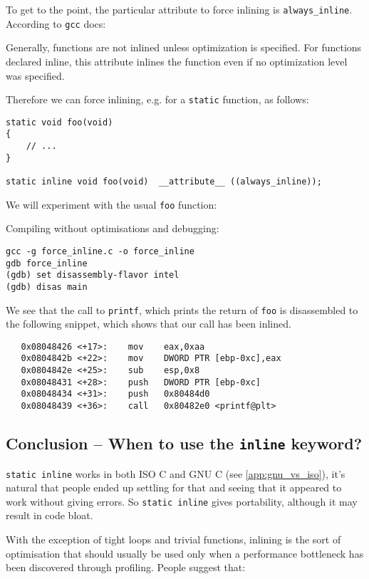 \documentclass[a4paper]{article}
\begin{document}
To get to the point, the particular attribute to force inlining is \texttt{always\_inline}. According to \texttt{gcc} docs:
\begin{myquote}
Generally, functions are not inlined unless optimization is specified. For functions declared inline, this attribute inlines the function even if no optimization level was specified.
\end{myquote}
Therefore we can force inlining, e.g. for a \texttt{static} function, as follows:
\begin{verbatim}
static void foo(void)
{
    // ...
}

static inline void foo(void)  __attribute__ ((always_inline));
\end{verbatim}
We will experiment with the usual \texttt{foo} function:

Compiling without optimisations and debugging:
\begin{lstlisting}[style=terminal]
gcc -g force_inline.c -o force_inline
gdb force_inline
(gdb) set disassembly-flavor intel
(gdb) disas main
\end{lstlisting}
We see that the call to \texttt{printf}, which prints the return of \texttt{foo} is disassembled to the following snippet, which shows that our call has been inlined.
\begin{verbatim}
   0x08048426 <+17>:	mov    eax,0xaa
   0x0804842b <+22>:	mov    DWORD PTR [ebp-0xc],eax
   0x0804842e <+25>:	sub    esp,0x8
   0x08048431 <+28>:	push   DWORD PTR [ebp-0xc]
   0x08048434 <+31>:	push   0x80484d0
   0x08048439 <+36>:	call   0x80482e0 <printf@plt>
\end{verbatim}


\subsection{Conclusion -- When to use the \texttt{inline} keyword?}

\texttt{static inline} works in both ISO C and GNU C (see \ref{app:gnu_vs_iso}), it's natural that people ended up settling for that and seeing that it appeared to work without giving errors. So \texttt{static inline} gives portability, although it may result in code bloat.

With the exception of tight loops and trivial functions, inlining is the sort of optimisation that should usually be used only when a performance bottleneck has been discovered through profiling. People suggest that:
\end{document}
